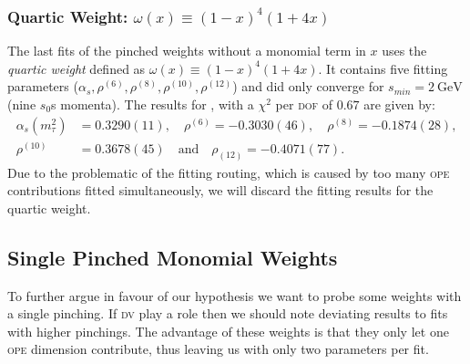 \documentclass[../../index.tex]{subfiles}
\begin{document}
\subsubsection{Quartic Weight: \(\omega(x) \equiv (1-x)^4(1+4x)\)}
\label{sec:quarticWeight}
The last fits of the pinched weights without a monomial term in \(x\) uses the
\textit{quartic weight} defined as \(\omega(x) \equiv (1-x)^4(1+4x)\). It
contains five fitting parameters (\(\alpha_s, \rho^{(6)}, \rho^{(8)},
\rho^{(10)}, \rho^{(12)}\)) and did only converge for
\(s_{min}=\SI{2}{\giga\eV}\) (nine \(s_0\)s momenta). The results for , with a
\(\chi^2\) per \textsc{dof} of \(0.67\) are given by:
\begin{equation}
  \begin{split}
    \alpha_s(m_\tau^2) &= 0.3290(11), \quad \rho^{(6)}=-0.3030(46), \quad \rho^{(8)}=-0.1874(28), \\
    \rho^{(10)} &= 0.3678(45) \quad \text{and} \quad \rho_{(12)}=-0.4071(77).
  \end{split}
\end{equation}
Due to the problematic of the fitting routing, which is caused by too many
\textsc{ope} contributions fitted simultaneously, we will discard the fitting
results for the quartic weight.


\subsection{Single Pinched Monomial Weights}
To further argue in favour of our hypothesis we want to probe some weights with
a single pinching. If \textsc{dv} play a role then we should note deviating
results to fits with higher pinchings. The advantage of these weights is that
they only let one \textsc{ope} dimension contribute, thus leaving us with only
two parameters per fit.
\end{document}
